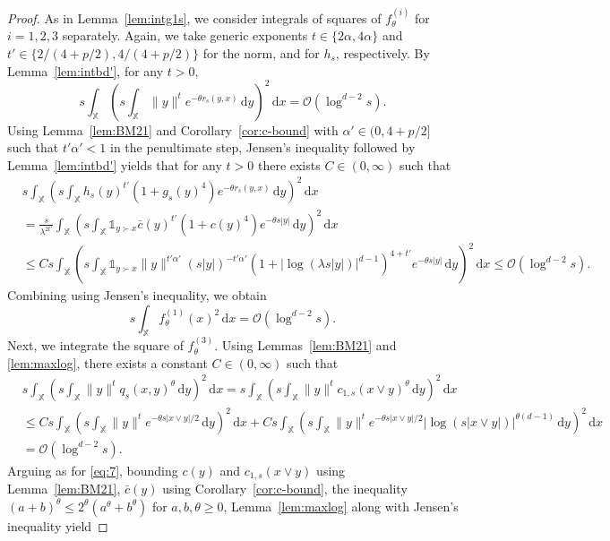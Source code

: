 \documentclass[11pt,reqno]{amsart}
\numberwithin{equation}{section}
\theoremstyle{definition}
\newcommand{\XX}{\mathbb{X}}
\newcommand{\diff}{{\,\mathrm d}}
\begin{document}
\begin{proof}
	As in Lemma~\ref{lem:intg1s}, we consider integrals of squares of
	$f_\theta^{(i)}$ for $i=1,2,3$ separately. Again, we take generic exponents $t \in \{2\alpha, 4\alpha\}$ and $t' \in \{2/(4+p/2), 4/(4+p/2)\}$ for the norm, and for $h_s$, respectively. By Lemma~\ref{lem:intbd'}, for any $t>0$,
	\begin{displaymath}
	s\int_{\XX} \left(s\int_{\XX} \|y\|^t e^{-\theta r_s(y,x)}\diff y\right)^2
	\diff x =\mathcal{O}(\log^{d-2} s). 
	\end{displaymath}
	Using Lemma~\ref{lem:BM21} and Corollary~\ref{cor:c-bound} with $\alpha'\in (0,4+p/2]$ such that $t'\alpha' <1$ in the penultimate step, Jensen's inequality followed by Lemma~\ref{lem:intbd'} yields that for any $t >0$ there exists $C \in (0,\infty)$ such that
	\begin{align*}
	&s \int_{\XX} \left(s \int_{\XX}h_s(y)^{t'} (1+g_s(y)^4)  e^{- \theta r_s(y,x)} 
	\diff y\right)^2 \diff x\\
	&= \frac{s}{\lambda^{2t'}} \int_{\XX} \left(s \int_{\XX} \mathds{1}_{y \succ x}\bar c (y)^{t'}  (1+c(y)^4) e^{-\theta s|y|} 
	\diff y\right)^2 \diff x\\
	&\le  C s \int_{\XX} \left(s \int_{\XX} \mathds{1}_{y \succ x}\|y\|^{t'\alpha'} (s|y|)^{-t'\alpha'}\left(1+ |\log (\lambda s|y|)|^{d-1}\right)^{4+t'} e^{- \theta s|y|} \diff y\right)^2 \diff x 
	\le \mathcal{O}(\log^{d-2} s).
	\end{align*}
	Combining using Jensen's inequality, we obtain
	\begin{displaymath}
	s \int_{\XX} f_{\theta}^{(1)}(x)^2 \diff x =\mathcal{O}(\log^{d-2} s).
	\end{displaymath}
	Next, we integrate the square of $f_{\theta}^{(3)}$. Using
	Lemmas~\ref{lem:BM21} and \ref{lem:maxlog}, there exists a constant $C \in (0,\infty)$ such that
	\begin{align*}
	&s \int_{\XX} \left(s \int_{\XX} \|y\|^t q_s(x,y)^{\theta}
	\diff y\right)^2 \diff x
	= s \int_{\XX} \left(s \int_{\XX}  \|y\|^t c_{1,s}(x\vee y)^{\theta}
	\diff y\right)^2 \diff x\nonumber\\
	&\le Cs \int_{\XX}\left(s \int_\XX \|y\|^t e^{-\theta s |x\vee y|/2} 
	\diff y \right)^2 \diff x 
	+ Cs \int_{\XX} \left(s \int_\XX \|y\|^t e^{-\theta s |x\vee y|/2} |\log (s|x \vee y|)|^{\theta(d-1)}
	\diff y \right)^2 \diff x\nonumber\\
	&=\mathcal{O}(\log^{d-2} s).
	\end{align*}
	Arguing as for \eqref{eq:7}, bounding $c(y)$ and $c_{1,s}(x \vee y)$ using Lemma~\ref{lem:BM21}, $\bar c (y)$ using Corollary~\ref{cor:c-bound}, the inequality $(a+b)^\theta \le 2^\theta (a^\theta + b^\theta)$ for $a, b, \theta \ge 0$, Lemma~\ref{lem:maxlog} along with Jensen's inequality yield

\end{proof}
\end{document}

